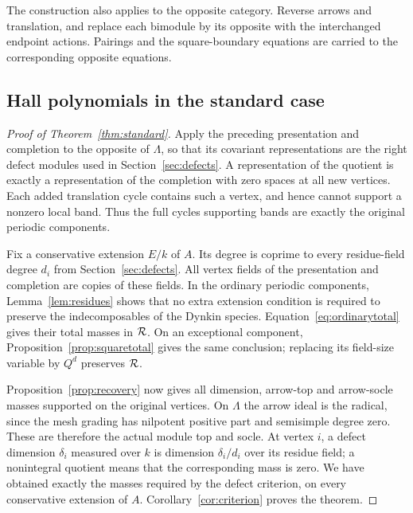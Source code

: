 The construction also applies to the opposite category. Reverse arrows and translation, and replace each bimodule by its opposite with the interchanged endpoint actions. Pairings and the square-boundary equations are carried to the corresponding opposite equations.

\subsection{Hall polynomials in the standard case}

\begin{proof}[Proof of Theorem~\ref{thm:standard}]
Apply the preceding presentation and completion to the opposite of $\Lambda$, so that its covariant representations are the right defect modules used in Section~\ref{sec:defects}. A representation of the quotient is exactly a representation of the completion with zero spaces at all new vertices. Each added translation cycle contains such a vertex, and hence cannot support a nonzero local band. Thus the full cycles supporting bands are exactly the original periodic components.

Fix a conservative extension $E/k$ of $A$. Its degree is coprime to every residue-field degree $d_i$ from Section~\ref{sec:defects}. All vertex fields of the presentation and completion are copies of these fields. In the ordinary periodic components, Lemma~\ref{lem:residues} shows that no extra extension condition is required to preserve the indecomposables of the Dynkin species. Equation~\eqref{eq:ordinarytotal} gives their total masses in $\mathcal R$. On an exceptional component, Proposition~\ref{prop:squaretotal} gives the same conclusion; replacing its field-size variable by $Q^d$ preserves $\mathcal R$.

Proposition~\ref{prop:recovery} now gives all dimension, arrow-top and arrow-socle masses supported on the original vertices. On $\Lambda$ the arrow ideal is the radical, since the mesh grading has nilpotent positive part and semisimple degree zero. These are therefore the actual module top and socle. At vertex $i$, a defect dimension $\delta_i$ measured over $k$ is dimension $\delta_i/d_i$ over its residue field; a nonintegral quotient means that the corresponding mass is zero. We have obtained exactly the masses required by the defect criterion, on every conservative extension of $A$. Corollary~\ref{cor:criterion} proves the theorem.
\end{proof}

